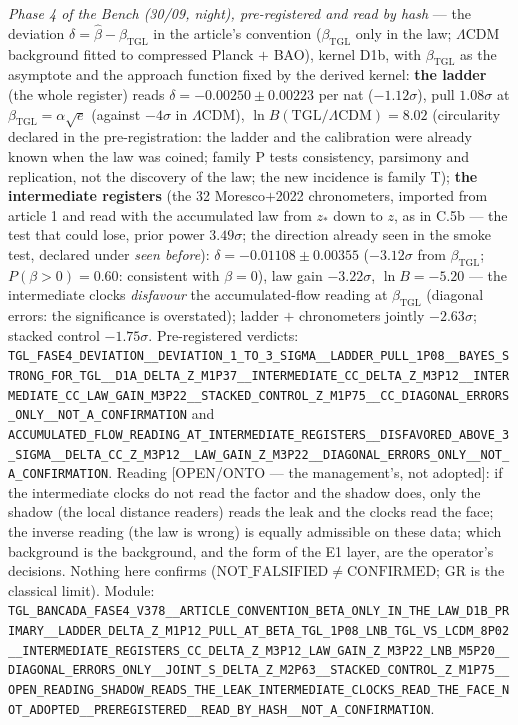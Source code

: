 \documentclass[11pt]{article}
\newcommand{\bTGL}{\beta_{\mathrm{TGL}}}\newcommand{\Msun}{M_{\odot}}\newcommand{\TGL}{\mathrm{TGL}}
\theoremstyle{definition}\newtheorem{deriv}{Derivation}
\begin{document}
\emph{Phase 4 of the Bench (30/09, night), pre-registered and read by hash} --- the deviation $\delta=\hat\beta-\bTGL$ in the article's convention ($\bTGL$ only in the law; $\Lambda$CDM background fitted to compressed Planck $+$ BAO), kernel D1b, with $\bTGL$ as the asymptote and the approach function fixed by the derived kernel: \textbf{the ladder} (the whole register) reads $\delta=-0.00250\pm0.00223$ per nat ($-1.12\sigma$), pull $1.08\sigma$ at $\bTGL=\alpha\sqrt e$ (against $-4\sigma$ in $\Lambda$CDM), $\ln B(\mathrm{TGL}/\Lambda\mathrm{CDM})=8.02$ (circularity declared in the pre-registration: the ladder and the calibration were already known when the law was coined; family P tests consistency, parsimony and replication, not the discovery of the law; the new incidence is family T); \textbf{the intermediate registers} (the 32 Moresco$+$2022 chronometers, imported from article 1 and read with the accumulated law from $z_*$ down to $z$, as in C.5b --- the test that could lose, prior power $3.49\sigma$; the direction already seen in the smoke test, declared under \emph{seen before}): $\delta=-0.01108\pm0.00355$ ($-3.12\sigma$ from $\bTGL$; $P(\beta>0)=0.60$: consistent with $\beta=0$), law gain $-3.22\sigma$, $\ln B=-5.20$ --- the intermediate clocks \emph{disfavour} the accumulated-flow reading at $\bTGL$ (diagonal errors: the significance is overstated); ladder $+$ chronometers jointly $-2.63\sigma$; stacked control $-1.75\sigma$. Pre-registered verdicts: \texttt{TGL\_FASE4\_DEVIATION\_\_DEVIATION\_1\_TO\_3\_SIGMA\_\_LADDER\_PULL\_1P08\_\_BAYES\_STRONG\_FOR\_TGL\_\_D1A\_DELTA\_Z\_M1P37\_\_INTERMEDIATE\_CC\_DELTA\_Z\_M3P12\_\_INTERMEDIATE\_CC\_LAW\_GAIN\_M3P22\_\_STACKED\_CONTROL\_Z\_M1P75\_\_CC\_DIAGONAL\_ERRORS\_ONLY\_\_NOT\_A\_CONFIRMATION} and \texttt{ACCUMULATED\_FLOW\_READING\_AT\_INTERMEDIATE\_REGISTERS\_\_DISFAVORED\_ABOVE\_3\_SIGMA\_\_DELTA\_CC\_Z\_M3P12\_\_LAW\_GAIN\_Z\_M3P22\_\_DIAGONAL\_ERRORS\_ONLY\_\_NOT\_A\_CONFIRMATION}. Reading \textsf{[OPEN/ONTO --- the management's, not adopted]}: if the intermediate clocks do not read the factor and the shadow does, only the shadow (the local distance readers) reads the leak and the clocks read the face; the inverse reading (the law is wrong) is equally admissible on these data; which background is the background, and the form of the E1 layer, are the operator's decisions. Nothing here confirms ($\mathrm{NOT\_FALSIFIED}\neq\mathrm{CONFIRMED}$; GR is the classical limit). Module: \texttt{TGL\_BANCADA\_FASE4\_V378\_\_ARTICLE\_CONVENTION\_BETA\_ONLY\_IN\_THE\_LAW\_D1B\_PRIMARY\_\_LADDER\_DELTA\_Z\_M1P12\_PULL\_AT\_BETA\_TGL\_1P08\_LNB\_TGL\_VS\_LCDM\_8P02\_\_INTERMEDIATE\_REGISTERS\_CC\_DELTA\_Z\_M3P12\_LAW\_GAIN\_Z\_M3P22\_LNB\_M5P20\_\_DIAGONAL\_ERRORS\_ONLY\_\_JOINT\_S\_DELTA\_Z\_M2P63\_\_STACKED\_CONTROL\_Z\_M1P75\_\_OPEN\_READING\_SHADOW\_READS\_THE\_LEAK\_INTERMEDIATE\_CLOCKS\_READ\_THE\_FACE\_NOT\_ADOPTED\_\_PREREGISTERED\_\_READ\_BY\_HASH\_\_NOT\_A\_CONFIRMATION}.
\end{document}
